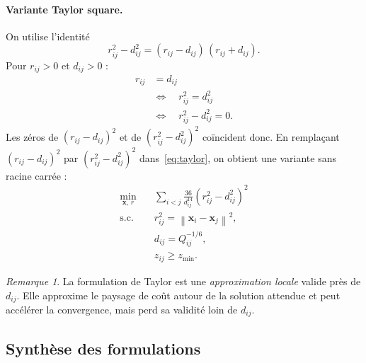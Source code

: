 \documentclass[11pt,a4paper]{article}
\theoremstyle{definition}
\theoremstyle{remark}
\newtheorem{remark}[theorem]{Remarque}
\newcommand{\norm}[1]{\left\|#1\right\|}
\begin{document}
\paragraph{Variante Taylor square.}
On utilise l'identité
\begin{equation}
  r_{ij}^2 - d_{ij}^2
  =
  (r_{ij}-d_{ij})\,(r_{ij}+d_{ij}).
\end{equation}
Pour $r_{ij}>0$ et $d_{ij}>0$ :
\begin{align}
  r_{ij}
  &=
  d_{ij}
  \\
  &\Longleftrightarrow
  \quad
  r_{ij}^2
  =
  d_{ij}^2
  \\
  &\Longleftrightarrow
  \quad
  r_{ij}^2 - d_{ij}^2
  =
  0.
\end{align}
Les zéros de $(r_{ij}-d_{ij})^2$ et de $(r_{ij}^2-d_{ij}^2)^2$ coïncident
donc. En remplaçant $(r_{ij}-d_{ij})^2$ par $(r_{ij}^2-d_{ij}^2)^2$
dans~\eqref{eq:taylor}, on obtient une variante sans racine carrée :
\begin{equation}
  \boxed{
  \begin{aligned}
    \min_{\mathbf{x},\,r}
    &\quad
    \sum_{i<j}
    \frac{36}{d_{ij}^{14}}
    (r_{ij}^2-d_{ij}^2)^2
    \\
    \text{s.c.}
    &\quad
    r_{ij}^2
    =
    \norm{\mathbf{x}_i-\mathbf{x}_j}^2,
    \\
    &\quad
    d_{ij}
    =
    Q_{ij}^{-1/6},
    \\
    &\quad
    z_{ij}
    \geq
    z_{\min}.
  \end{aligned}
  }
  \label{eq:taylor-square}
\end{equation}

\begin{remark}
La formulation de Taylor est une \emph{approximation locale} valide près
de $d_{ij}$. Elle approxime le paysage de coût autour de la solution
attendue et peut accélérer la convergence, mais perd sa validité loin
de $d_{ij}$.
\end{remark}

\subsection{Synthèse des formulations}
\label{sec:form-synthese}
\end{document}
